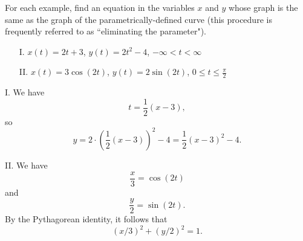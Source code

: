 \documentclass[]{ximera}
\begin{document}
\begin{problem}
For each example, find an equation in the variables $x$ and $y$ whose graph is the same as the graph of the parametrically-defined curve (this procedure is frequently referred to as ``eliminating the parameter").

\begin{itemize}
\item[I.] $x(t) = 2t+3$, $y(t)=2t^2-4$, $-\infty < t < \infty$  
\item[II.] $x(t) = 3 \cos (2t)$, $y(t) = 2 \sin(2t)$, $0 \leq t \leq \frac{\pi}{2}$
\end{itemize}
\begin{solution}
I. We have 
$$
t = \frac{1}{2}(x-3),
$$
so 
$$
y = 2 \cdot \left(\frac{1}{2}(x-3)\right)^2 - 4 = \frac{1}{2}(x-3)^2 - 4.
$$

II. We have
$$
\frac{x}{3} = \cos(2t)
$$
and 
$$
\frac{y}{2} = \sin(2t).
$$
By the Pythagorean identity, it follows that
$$
(x/3)^2 + (y/2)^2 = 1.
$$
\end{solution}
\end{problem}
\end{document}
